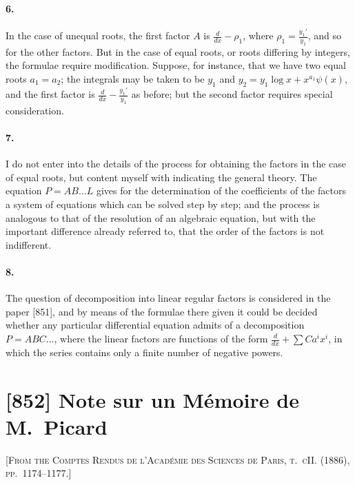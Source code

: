\documentclass[11pt,a4paper]{article}
\theoremstyle{definition}
\begin{document}
\paragraph{6.} In the case of unequal roots, the first factor $A$ is $\frac{d}{dx} - \rho_{1}$, where $\rho_{1} = \frac{y_{1}'}{y_{1}}$, and so for the other factors. But in the case of equal roots, or roots differing by integers, the formulae require modification. Suppose, for instance, that we have two equal roots $a_{1} = a_{2}$; the integrals may be taken to be $y_{1}$ and $y_{2} = y_{1}\log x + x^{a_{1}}\psi(x)$, and the first factor is $\frac{d}{dx} - \frac{y_{1}'}{y_{1}}$ as before; but the second factor requires special consideration.

\paragraph{7.} I do not enter into the details of the process for obtaining the factors in the case of equal roots, but content myself with indicating the general theory. The equation $P = AB\ldots L$ gives for the determination of the coefficients of the factors a system of equations which can be solved step by step; and the process is analogous to that of the resolution of an algebraic equation, but with the important difference already referred to, that the order of the factors is not indifferent.

\paragraph{8.} The question of decomposition into linear regular factors is considered in the paper [851], and by means of the formulae there given it could be decided whether any particular differential equation admits of a decomposition $P = ABC\ldots$, where the linear factors are functions of the form $\frac{d}{dx} + \sum Ca^{i}x^{i}$, in which the series contains only a finite number of negative powers.

\newpage
\section*{[852] Note sur un M\'{e}moire de M.\ Picard}

\noindent\textsc{[From the Comptes Rendus de l'Acad\'{e}mie des Sciences de Paris, t.~cII. (1886), pp.~1174--1177.]}
\end{document}

